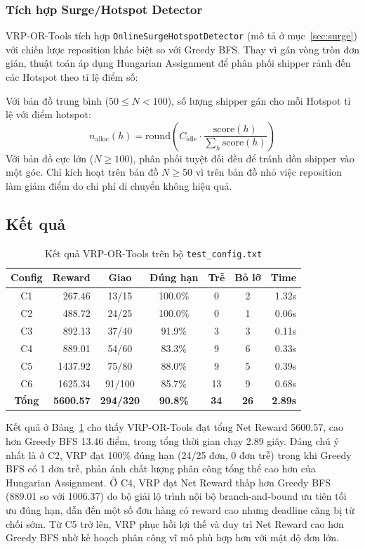 \documentclass[conference]{IEEEtran}
\begin{document}
\subsubsection{Tích hợp Surge/Hotspot Detector}
VRP-OR-Tools tích hợp \texttt{OnlineSurgeHotspotDetector} (mô tả ở mục~\ref{sec:surge}) với chiến lược reposition khác biệt so với Greedy BFS. Thay vì gán vòng tròn đơn giản, thuật toán áp dụng Hungarian Assignment để phân phối shipper rảnh đến các Hotspot theo tỉ lệ điểm số:
 
Với bản đồ trung bình ($50 \le N < 100$), số lượng shipper gán cho mỗi Hotspot tỉ lệ với điểm hotspot:
\begin{equation}
n_{\text{alloc}}(h) = \text{round}\!\left(C_{\text{idle}} \cdot \frac{\text{score}(h)}{\sum_h \text{score}(h)}\right)
\end{equation}
Với bản đồ cực lớn ($N \ge 100$), phân phối tuyệt đối đều để tránh dồn shipper vào một góc. Chỉ kích hoạt trên bản đồ $N \ge 50$ vì trên bản đồ nhỏ việc reposition làm giảm điểm do chi phí di chuyển không hiệu quả.
 
\subsection{Kết quả}
\begin{table}[htbp]
\caption{Kết quả VRP-OR-Tools trên bộ \texttt{test\_config.txt}}
\label{tab:vrp-phase1}
\centering
\footnotesize
\begin{tabular}{|c|r|c|c|c|c|r|}
\hline
\textbf{Config} & \textbf{Reward} & \textbf{Giao} & \textbf{Đúng hạn} & \textbf{Trễ} & \textbf{Bỏ lỡ} & \textbf{Time} \\
\hline
C1 & 267.46  & 13/15  & 100.0\% & 0  & 2 & 1.32s \\
C2 & 488.72  & 24/25  & 100.0\% & 0  & 1 & 0.06s \\
C3 & 892.13  & 37/40  &  91.9\% & 3  & 3 & 0.11s \\
C4 & 889.01  & 54/60  &  83.3\% & 9  & 6 & 0.33s \\
C5 & 1437.92 & 75/80  &  88.0\% & 9  & 5 & 0.39s \\
C6 & 1625.34 & 91/100 &  85.7\% & 13 & 9 & 0.68s \\
\hline
\textbf{Tổng} & \textbf{5600.57} & \textbf{294/320} & \textbf{90.8\%} & \textbf{34} & \textbf{26} & \textbf{2.89s} \\
\hline
\end{tabular}
\end{table}
 
Kết quả ở Bảng~\ref{tab:vrp-phase1} cho thấy VRP-OR-Tools đạt tổng Net Reward 5600.57, cao hơn Greedy BFS 13.46 điểm, trong tổng thời gian chạy 2.89 giây. Đáng chú ý nhất là ở C2, VRP đạt 100\% đúng hạn (24/25 đơn, 0 đơn trễ) trong khi Greedy BFS có 1 đơn trễ, phản ánh chất lượng phân công tổng thể cao hơn của Hungarian Assignment. Ở C4, VRP đạt Net Reward thấp hơn Greedy BFS (889.01 so với 1006.37) do bộ giải lộ trình nội bộ branch-and-bound ưu tiên tối ưu đúng hạn, dẫn đến một số đơn hàng có reward cao nhưng deadline căng bị từ chối sớm. Từ C5 trở lên, VRP phục hồi lợi thế và duy trì Net Reward cao hơn Greedy BFS nhờ kế hoạch phân công vĩ mô phù hợp hơn với mật độ đơn lớn.
 
\end{document}
